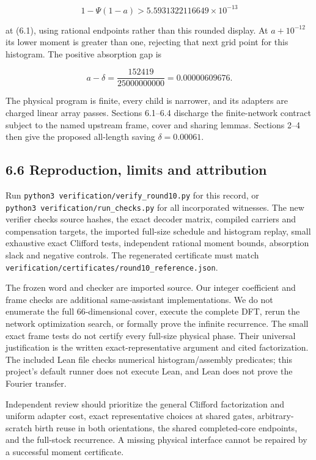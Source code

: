 \documentclass[
  11pt,
]{article}
\begin{document}
\[
1-\Psi(1-a)>5.5931322116649\times10^{-13}
\]

at (6.1), using rational endpoints rather than this rounded display. At
\(a+10^{-12}\) its lower moment is greater than one, rejecting that next
grid point for this histogram. The positive absorption gap is

\[
a-\delta=\frac{152419}{25000000000}=0.00000609676.
\]

The physical program is finite, every child is narrower, and its
adapters are charged linear array passes. Sections 6.1--6.4 discharge
the finite-network contract subject to the named upstream frame, cover
and sharing lemmas. Sections 2--4 then give the proposed all-length
saving \(\delta=0.00061\).

\subsection{6.6 Reproduction, limits and
attribution}\label{reproduction-limits-and-attribution}

Run \texttt{python3\ verification/\allowbreak{}verify\_\allowbreak{}round10.py} for this record,
or \texttt{python3\ verification/\allowbreak{}run\_\allowbreak{}checks.py} for all incorporated
witnesses. The new verifier checks source hashes, the exact decoder
matrix, compiled carriers and compensation targets, the imported
full-size schedule and histogram replay, small exhaustive exact Clifford
tests, independent rational moment bounds, absorption slack and negative
controls. The regenerated certificate must match
\texttt{verification/\allowbreak{}certificates/\allowbreak{}round10\_\allowbreak{}reference.json}.

The frozen word and checker are imported source. Our integer coefficient
and frame checks are additional same-assistant implementations. We do
not enumerate the full 66-dimensional cover, execute the complete DFT,
rerun the network optimization search, or formally prove the infinite
recurrence. The small exact frame tests do not certify every full-size
physical phase. Their universal justification is the written
exact-representative argument and cited factorization. The included Lean
file checks numerical histogram/assembly predicates; this project's
default runner does not execute Lean, and Lean does not prove the
Fourier transfer.

Independent review should prioritize the general Clifford factorization
and uniform adapter cost, exact representative choices at shared gates,
arbitrary-scratch birth reuse in both orientations, the shared
completed-core endpoints, and the full-stock recurrence. A missing
physical interface cannot be repaired by a successful moment
certificate.
\end{document}
